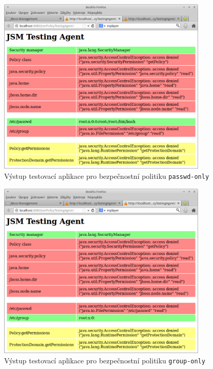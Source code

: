 \begin{figure}[ht]
  \centering
  \includegraphics[width=10cm]{fig/test-passwd}
  \caption{Výstup testovací aplikace pro bezpečnostní politiku {\tt passwd-only}}
  \label{testPasswd}
\end{figure}
\begin{figure}[ht]
  \centering
  \includegraphics[width=10cm]{fig/test-group}
  \caption{Výstup testovací aplikace pro bezpečnostní politiku {\tt group-only}}
  \label{testGroup}
\end{figure}


